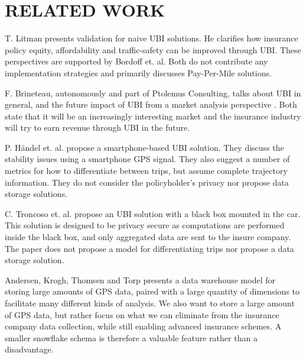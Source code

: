 \section{RELATED WORK}\label{sec:relwork}

T. Litman presents validation for naive UBI solutions\cite{art:PAYDVehInsur}\cite{art:vehicfeacosben}\cite{art:PAYDafford}. He clarifies how insurance policy equity, affordability and traffic-safety can be improved through UBI. These perspectives are supported by Bordoff et. al\cite{art:PAYDredharms}. Both do not contribute any implementation strategies and primarily discusses Pay-Per-Mile solutions.

F. Brineteau, autonomously and part of Ptolemus Consulting, talks about UBI in general, and the future impact of UBI from a market analysis perspective \cite{art:telematicsmatter}\cite{mar:telematics12}\cite{mar:ubi13}\cite{mar:ubi16}. Both state that it will be an increasingly interesting market and the insurance industry will try to earn revenue through UBI in the future.

P. Händel et. al. propose a smartphone-based UBI solution\cite{art:insurtelematics}\cite{art:smartphonemonitor}. They discuss the stability issues using a smartphone GPS signal. They also suggest a number of metrics for how to differentiate between trips, but assume complete trajectory information. They do not consider the policyholder's privacy nor propose data storage solutions.

C. Troncoso et. al. propose an UBI solution with a black box mounted in the car\cite{art:PriPAYDprivacy}. This solution is designed to be privacy secure as computations are performed inside the black box, and only aggregated data are sent to the insure company. The paper does not propose a model for differentiating trips nor propose a data storage solution.

Andersen, Krogh, Thomsen and Torp presents a data warehouse model for storing large amounts of GPS data, paired with a large quantity of dimensions to facilitate many different kinds of analysis\cite{art:gpswarehouse}. We also want to store a large amount of GPS data, but rather focus on what we can eliminate from the insurance company data collection, while still enabling advanced insurance schemes. A smaller snowflake schema is therefore a valuable feature rather than a disadvantage.


